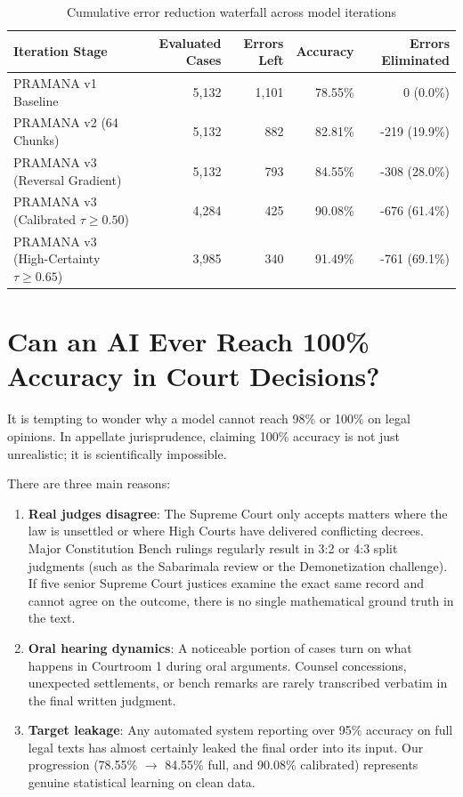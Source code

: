 \documentclass[11pt,a4paper]{article}
\begin{document}
\begin{table}[h]
\caption{Cumulative error reduction waterfall across model iterations}
\label{tab:waterfall}
\centering
\begin{tabularx}{\textwidth}{lrrrr}
\toprule
\textbf{Iteration Stage} & \textbf{Evaluated Cases} & \textbf{Errors Left} & \textbf{Accuracy} & \textbf{Errors Eliminated} \\
\midrule
PRAMANA v1 Baseline & 5,132 & 1,101 & 78.55\% & 0 (0.0\%) \\
PRAMANA v2 (64 Chunks) & 5,132 & 882 & 82.81\% & -219 (19.9\%) \\
PRAMANA v3 (Reversal Gradient) & 5,132 & 793 & 84.55\% & -308 (28.0\%) \\
PRAMANA v3 (Calibrated $\tau \ge 0.50$) & 4,284 & 425 & 90.08\% & -676 (61.4\%) \\
PRAMANA v3 (High-Certainty $\tau \ge 0.65$) & 3,985 & 340 & 91.49\% & -761 (69.1\%) \\
\bottomrule
\end{tabularx}
\end{table}

\section{Can an AI Ever Reach 100\% Accuracy in Court Decisions?}
It is tempting to wonder why a model cannot reach 98\% or 100\% on legal opinions. In appellate jurisprudence, claiming 100\% accuracy is not just unrealistic; it is scientifically impossible.

There are three main reasons:
\begin{enumerate}
    \item \textbf{Real judges disagree}: The Supreme Court only accepts matters where the law is unsettled or where High Courts have delivered conflicting decrees. Major Constitution Bench rulings regularly result in 3:2 or 4:3 split judgments (such as the Sabarimala review or the Demonetization challenge). If five senior Supreme Court justices examine the exact same record and cannot agree on the outcome, there is no single mathematical ground truth in the text.
    \item \textbf{Oral hearing dynamics}: A noticeable portion of cases turn on what happens in Courtroom 1 during oral arguments. Counsel concessions, unexpected settlements, or bench remarks are rarely transcribed verbatim in the final written judgment.
    \item \textbf{Target leakage}: Any automated system reporting over 95\% accuracy on full legal texts has almost certainly leaked the final order into its input. Our progression (78.55\% $\rightarrow$ 84.55\% full, and 90.08\% calibrated) represents genuine statistical learning on clean data.
\end{enumerate}
\end{document}
